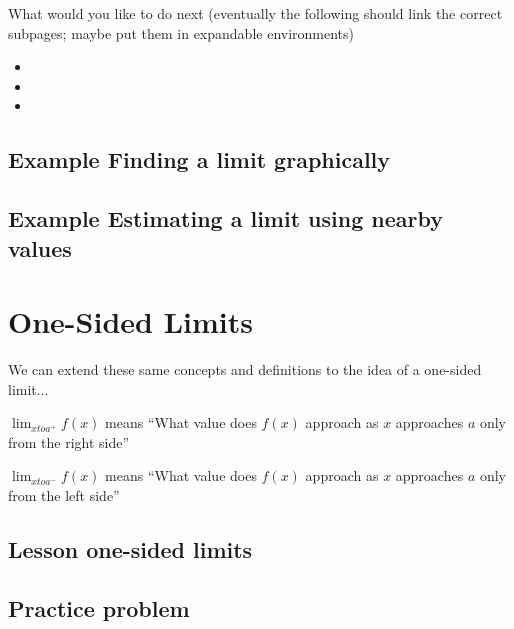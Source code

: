 \documentclass{ximera}
\begin{document}
What would you like to do next
(eventually the following should link the correct subpages; maybe put them in expandable environments)
\begin{itemize}
    \item {} 
    \item {}
    \item {}
\end{itemize}

\subsection{Example Finding a limit graphically}
\begin{center}
\end{center}

\subsection{Example Estimating a limit using nearby values}
\begin{center}
\end{center}

\section{One-Sided Limits}

We can extend these same concepts and definitions to the idea of a one-sided limit...

$\lim_{x to a^+} f(x)$ means ``What value does $f(x)$ approach as $x$ approaches $a$ only from the right side''

$\lim_{x to a^-} f(x)$ means ``What value does $f(x)$ approach as $x$ approaches $a$ only from the left side''

\subsection{Lesson one-sided limits}

\begin{center}
\end{center}

\subsection{Practice problem}
\end{document}
